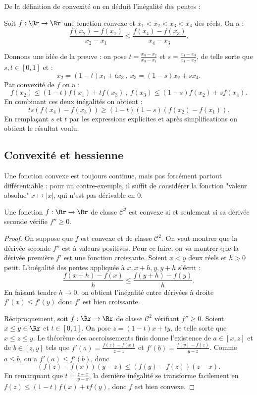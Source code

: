 De la définition de convexité on en déduit l'inégalité des pentes :

\begin{proposition}{}{}
	Soit $f : \Rr \to \Rr$ une fonction convexe et $x_1<x_2<x_3<x_4$ des réels. On a : $$\frac{f(x_2)-f(x_1)}{x_2-x_1} \le \frac{f(x_4)-f(x_3)}{x_4-x_3}.$$
\end{proposition}

Donnons une idée de la preuve : on pose $t = \frac{x_3-x_2}{x_3-x_1}$ et $s = \frac{x_4-x_3}{x_4-x_2}$, de telle sorte que $s,t \in [0,1]$ et : $$x_2 = (1-t)x_1+t x_3 \ , \ x_3 = (1-s) x_2+s x_4.$$ Par convexité de $f$ on a : $$f(x_2) \le (1-t) f(x_1)+t f(x_3) \ , \ f(x_3) \le (1-s) f(x_2)+s f(x_4).$$ En combinant ces deux inégalités on obtient : $$ts(f(x_4)-f(x_3)) \geq (1-t) (1-s) (f(x_2)-f(x_1)).$$ En remplaçant $s$ et $t$ par les expressions explicites et après simplifications on obtient le résultat voulu.

\subsection{Convexité et hessienne}

Une fonction convexe est toujours continue, mais pas forcément partout différentiable : pour un contre-exemple, il suffit de considérer la fonction "valeur absolue" $x \mapsto |x|$, qui n'est pas dérivable en $0$.

\bigskip

\begin{proposition}{}{}
	Une fonction $f : \Rr \to \Rr$ de classe $\mathcal{C}^2$ est convexe si et seulement si sa dérivée seconde vérifie $f'' \geq 0$.
\end{proposition}

\begin{proof}
	On suppose que $f$ est convexe et de classe $\mathcal{C}^2$. On veut montrer que la dérivée seconde $f''$ est à valeurs positives. Pour ce faire, on va montrer que la dérivée première $f'$ est une fonction croissante. Soient $x<y$ deux réels et $h>0$ petit. L'inégalité des pentes appliquée à $x,x+h,y,y+h$ s'écrit : $$\frac{f(x+h)-f(x)}{h} \le \frac{f(y+h)-f(y)}{h}.$$ En faisant tendre $h \to 0$, on obtient l'inégalité entre dérivées à droite $f'(x) \le f'(y)$ donc $f'$ est bien croissante.
	
	\bigskip
	
	Réciproquement, soit $f : \Rr \to \Rr$ de classe $\mathcal{C}^2$ vérifiant $f'' \ge 0$. Soient $x \le y \in \Rr$ et $t \in [0,1]$. On pose $z = (1-t) x + t y$, de telle sorte que $x \le z \le y$. Le théorème des accroissements finis donne l'existence de $a \in [x,z]$ et de $b \in [z,y]$ tels que $f'(a) = \frac{f(z)-f(x)}{z-x}$ et $f'(b) = \frac{f(y)-f(z)}{y-z}$. Comme $a \le b$, on a $f'(a) \le f'(b)$, donc $$(f(z)-f(x))(y-z) \le (f(y)-f(z))(z-x).$$ En remarquant que $t = \frac{z-x}{y-x}$, la dernière inégalité se transforme facilement en $f(z) \le (1-t) f(x) + t f(y)$, donc $f$ est bien convexe.
\end{proof}

